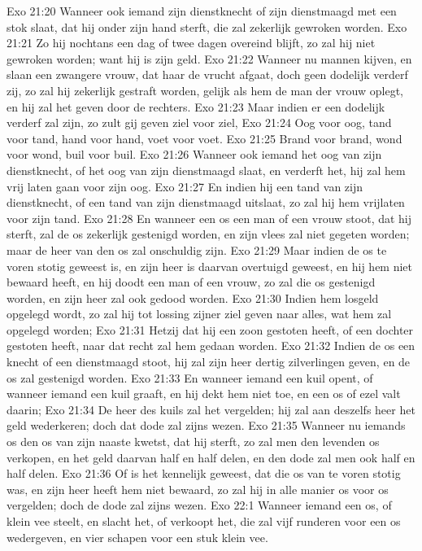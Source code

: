 Exo 21:20  Wanneer ook iemand zijn dienstknecht of zijn dienstmaagd met een stok slaat, dat hij onder zijn hand sterft, die zal zekerlijk gewroken worden.
Exo 21:21  Zo hij nochtans een dag of twee dagen overeind blijft, zo zal hij niet gewroken worden; want hij is zijn geld.
Exo 21:22  Wanneer nu mannen kijven, en slaan een zwangere vrouw, dat haar de vrucht afgaat, doch geen dodelijk verderf zij, zo zal hij zekerlijk gestraft worden, gelijk als hem de man der vrouw oplegt, en hij zal het geven door de rechters.
Exo 21:23  Maar indien er een dodelijk verderf zal zijn, zo zult gij geven ziel voor ziel,
Exo 21:24  Oog voor oog, tand voor tand, hand voor hand, voet voor voet.
Exo 21:25  Brand voor brand, wond voor wond, buil voor buil.
Exo 21:26  Wanneer ook iemand het oog van zijn dienstknecht, of het oog van zijn dienstmaagd slaat, en verderft het, hij zal hem vrij laten gaan voor zijn oog.
Exo 21:27  En indien hij een tand van zijn dienstknecht, of een tand van zijn dienstmaagd uitslaat, zo zal hij hem vrijlaten voor zijn tand.
Exo 21:28  En wanneer een os een man of een vrouw stoot, dat hij sterft, zal de os zekerlijk gestenigd worden, en zijn vlees zal niet gegeten worden; maar de heer van den os zal onschuldig zijn.
Exo 21:29  Maar indien de os te voren stotig geweest is, en zijn heer is daarvan overtuigd geweest, en hij hem niet bewaard heeft, en hij doodt een man of een vrouw, zo zal die os gestenigd worden, en zijn heer zal ook gedood worden.
Exo 21:30  Indien hem losgeld opgelegd wordt, zo zal hij tot lossing zijner ziel geven naar alles, wat hem zal opgelegd worden;
Exo 21:31  Hetzij dat hij een zoon gestoten heeft, of een dochter gestoten heeft, naar dat recht zal hem gedaan worden.
Exo 21:32  Indien de os een knecht of een dienstmaagd stoot, hij zal zijn heer dertig zilverlingen geven, en de os zal gestenigd worden.
Exo 21:33  En wanneer iemand een kuil opent, of wanneer iemand een kuil graaft, en hij dekt hem niet toe, en een os of ezel valt daarin;
Exo 21:34  De heer des kuils zal het vergelden; hij zal aan deszelfs heer het geld wederkeren; doch dat dode zal zijns wezen.
Exo 21:35  Wanneer nu iemands os den os van zijn naaste kwetst, dat hij sterft, zo zal men den levenden os verkopen, en het geld daarvan half en half delen, en den dode zal men ook half en half delen.
Exo 21:36  Of is het kennelijk geweest, dat die os van te voren stotig was, en zijn heer heeft hem niet bewaard, zo zal hij in alle manier os voor os vergelden; doch de dode zal zijns wezen.
Exo 22:1  Wanneer iemand een os, of klein vee steelt, en slacht het, of verkoopt het, die zal vijf runderen voor een os wedergeven, en vier schapen voor een stuk klein vee.
